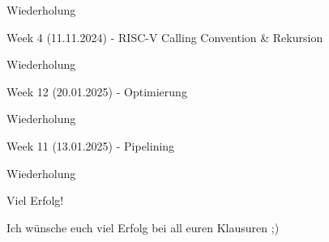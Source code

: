 \documentclass[
  german,            %
  aspectratio=169,    %
]{tumbeamer}
\begin{document}
\begin{frame}[c]{}{}
	\begin{center}
	  \LARGE Wiederholung
	\end{center}
\end{frame}

\begin{frame}[c]{Week 4 (11.11.2024) - RISC-V Calling Convention \& Rekursion}{}
	\begin{center}
	  \LARGE Wiederholung
	\end{center}
\end{frame}

\begin{frame}[c]{Week 12 (20.01.2025) - Optimierung}{}
	\begin{center}
	  \LARGE Wiederholung
	\end{center}
\end{frame}

\begin{frame}[c]{Week 11 (13.01.2025) - Pipelining}{}
	\begin{center}
	  \LARGE Wiederholung
	\end{center}
\end{frame}

\begin{frame}[c]{Viel Erfolg!}{}
  \begin{center}
	\LARGE Ich wünsche euch viel Erfolg bei all euren Klausuren ;)
  \end{center}
\end{frame}
\end{document}
